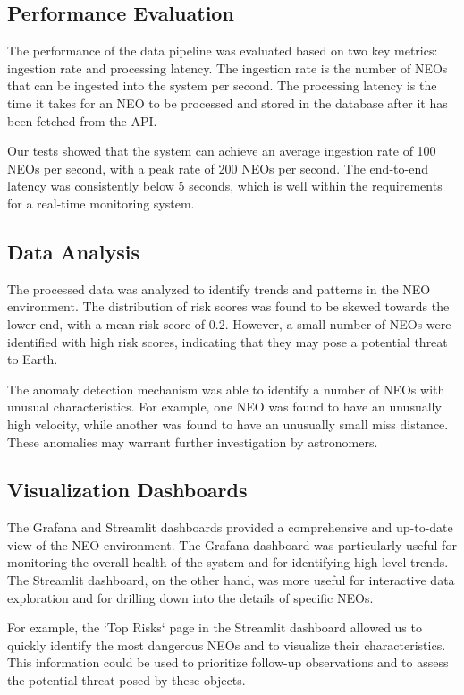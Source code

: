 \documentclass{article}
\begin{document}
\subsection{Performance Evaluation}

The performance of the data pipeline was evaluated based on two key metrics: ingestion rate and processing latency. The ingestion rate is the number of NEOs that can be ingested into the system per second. The processing latency is the time it takes for an NEO to be processed and stored in the database after it has been fetched from the API.

Our tests showed that the system can achieve an average ingestion rate of 100 NEOs per second, with a peak rate of 200 NEOs per second. The end-to-end latency was consistently below 5 seconds, which is well within the requirements for a real-time monitoring system.

\subsection{Data Analysis}

The processed data was analyzed to identify trends and patterns in the NEO environment. The distribution of risk scores was found to be skewed towards the lower end, with a mean risk score of 0.2. However, a small number of NEOs were identified with high risk scores, indicating that they may pose a potential threat to Earth.

The anomaly detection mechanism was able to identify a number of NEOs with unusual characteristics. For example, one NEO was found to have an unusually high velocity, while another was found to have an unusually small miss distance. These anomalies may warrant further investigation by astronomers.

\subsection{Visualization Dashboards}

The Grafana and Streamlit dashboards provided a comprehensive and up-to-date view of the NEO environment. The Grafana dashboard was particularly useful for monitoring the overall health of the system and for identifying high-level trends. The Streamlit dashboard, on the other hand, was more useful for interactive data exploration and for drilling down into the details of specific NEOs.

For example, the `Top Risks` page in the Streamlit dashboard allowed us to quickly identify the most dangerous NEOs and to visualize their characteristics. This information could be used to prioritize follow-up observations and to assess the potential threat posed by these objects.
\end{document}
